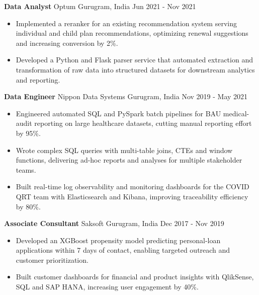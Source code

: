 \documentclass[10pt,a4paper]{article}
\newcommand{\role}[4]{\textbf{#1} \textbar{} #2 \hfill #3 \textbar{} #4\par}
\begin{document}
\vspace{3pt}
\role{Data Analyst}{Optum}{Gurugram, India}{Jun 2021 - Nov 2021}
\begin{itemize}
  \item Implemented a reranker for an existing recommendation system serving individual and child plan recommendations, optimizing renewal suggestions and increasing conversion by 2\%.
  \item Developed a Python and Flask parser service that automated extraction and transformation of raw data into structured datasets for downstream analytics and reporting.
\end{itemize}
\vspace{3pt}
\role{Data Engineer}{Nippon Data Systems}{Gurugram, India}{Nov 2019 - May 2021}
\begin{itemize}
  \item Engineered automated SQL and PySpark batch pipelines for BAU medical-audit reporting on large healthcare datasets, cutting manual reporting effort by 95\%.
  \item Wrote complex SQL queries with multi-table joins, CTEs and window functions, delivering ad-hoc reports and analyses for multiple stakeholder teams.
  \item Built real-time log observability and monitoring dashboards for the COVID QRT team with Elasticsearch and Kibana, improving traceability efficiency by 80\%.
\end{itemize}
\vspace{3pt}
\role{Associate Consultant}{Saksoft}{Gurugram, India}{Dec 2017 - Nov 2019}
\begin{itemize}
  \item Developed an XGBoost propensity model predicting personal-loan applications within 7 days of contact, enabling targeted outreach and customer prioritization.
  \item Built customer dashboards for financial and product insights with QlikSense, SQL and SAP HANA, increasing user engagement by 40\%.
\end{itemize}
\end{document}
